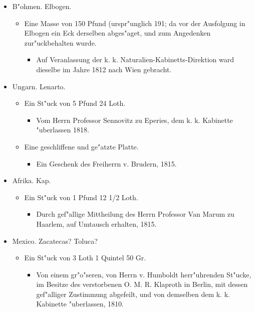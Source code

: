 \documentclass[a4paper, 11pt, oneside, polutonikogreek, german]{article}
\begin{document}
\begin{itemize}
\begin{itemize}
    \end{itemize}
    \item B"ohmen. Elbogen.
    \begin{itemize}
        \item Eine Masse von 150 Pfund (urspr"unglich 191; da vor der Ausfolgung in Elbogen ein Eck derselben abges"aget, und zum Angedenken zur"uckbehalten wurde.
        \begin{itemize}
            \item Auf Veranlassung der k. k. Naturalien-Kabinetts-Direktion ward dieselbe im Jahre 1812 nach Wien gebracht.
        \end{itemize}
    \end{itemize}
    \item Ungarn. Lenarto.
    \begin{itemize}
        \item Ein St"uck von 5 Pfund 24 Loth.
        \begin{itemize}
            \item Vom Herrn Professor Sennovitz zu Eperies, dem k. k. Kabinette "uberlassen 1818.
        \end{itemize}
        \item Eine geschliffene und ge"atzte Platte.
        \begin{itemize}
            \item Ein Geschenk des Freiherrn v. Brudern, 1815.
        \end{itemize}
    \end{itemize}
    \item Afrika. Kap.
    \begin{itemize}
        \item Ein St"uck von 1 Pfund 12 1/2 Loth.
        \begin{itemize}
            \item Durch gef"allige Mittheilung des Herrn Professor Van Marum zu Haarlem, auf Umtausch erhalten, 1815.
        \end{itemize}
    \end{itemize}
    \item Mexico. Zacatecas? Toluca?
    \begin{itemize}
        \item Ein St"uck von 3 Loth 1 Quintel 50 Gr.
        \begin{itemize}
            \item Von einem gr"o"seren, von Herrn v. Humboldt herr"uhrenden St"ucke, im Besitze des verstorbenen O. M. R. Klaproth in Berlin, mit dessen gef"alliger Zustimmung abgefeilt, und von demselben dem k. k. Kabinette "uberlassen, 1810.

\end{itemize}
\end{itemize}
\end{itemize}
\end{document}
